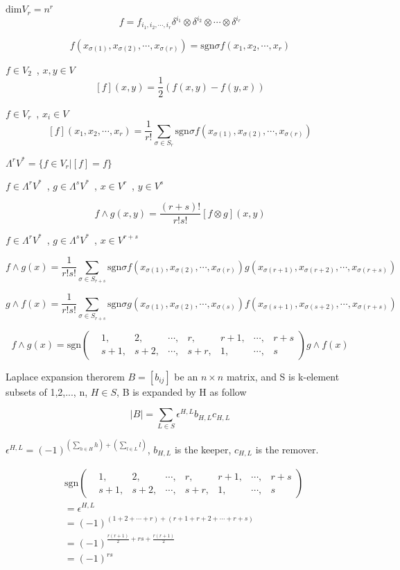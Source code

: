 \documentclass[12pt,a4paper]{article}
\begin{document}
$\mathrm{dim}V_r = n^r$
\[
	f = f_{i_1,i_2,\cdots,i_r} \delta^{i_1} \otimes \delta^{i_2} \otimes \cdots \otimes \delta^{i_r}
\]



$$
	f(x_{\sigma(1)},x_{\sigma(2)},\cdots,x_{\sigma(r)}) = \mathrm{sgn}\sigma f(x_1,x_2,\cdots,x_r) 
$$
\newline

$f \in V_2$ \,, $x,y \in V$
$$
	[f](x,y) = \frac{1}{2}(f(x,y)-f(y,x))
$$

$f \in V_r$ \,, $x_i \in V$
$$
	[f](x_1,x_2,\cdots,x_r) = \frac{1}{r!}\sum_{\sigma \in S_r} \mathrm{sgn}\sigma f(x_{\sigma(1)},x_{\sigma(2)},\cdots,x_{\sigma(r)})
$$

$ \Lambda^r V^* = \{f\in V_r |[f]=f \}$

$f \in \Lambda^r V^*$ \,, $g \in \Lambda^s V^*$ \,, $x \in V^r$ \,, $y \in V^s$

\[
	f\wedge g (x,y) = \frac{(r+s)!}{r!s!}[f\otimes g](x,y)
\]

$f \in \Lambda^r V^*$ \,, $g \in \Lambda^s V^*$ \,, $x \in V^{r+s}$

\[
	f\wedge g (x) = \frac{1}{r!s!}\sum_{\sigma \in S_{r+s}} \mathrm{sgn}\sigma f(x_{\sigma(1)},x_{\sigma(2)},\cdots,x_{\sigma(r)})g(x_{\sigma(r+1)},x_{\sigma(r+2)},\cdots,x_{\sigma(r+s)})
\]

\[
		g\wedge f (x) = \frac{1}{r!s!}\sum_{\sigma \in S_{r+s}} \mathrm{sgn}\sigma g(x_{\sigma(1)},x_{\sigma(2)},\cdots,x_{\sigma(s)})f(x_{\sigma(s+1)},x_{\sigma(s+2)},\cdots,x_{\sigma(r+s)})
\]

\[
	f\wedge g (x) =\mathrm{sgn}\begin{pmatrix}
	&1,&2,&\cdots,&r,&r+1,&\cdots,&r+s \\
	&s+1,&s+2,&\cdots,&s+r,&1,&\cdots,&s
	\end{pmatrix} g \wedge f(x)
\]

Laplace expansion therorem
$B = [b_{ij}]$ be an $n \times n$ matrix, and S is k-element subsets of {1,2,..., n}, $H \in S$, B is expanded by H as follow

\[
	|B| = \sum_{L \in S}\epsilon^{H,L}b_{H,L}c_{H,L}
\]

$\epsilon^{H,L} = (-1)^{(\sum_{h \in H} h)+(\sum_{l \in L} l)}$, $b_{H,L}$ is the keeper, $c_{H,L}$ is the remover.


\begin{align*}
&\mathrm{sgn}\begin{pmatrix}
	&1,&2,&\cdots,&r,&r+1,&\cdots,&r+s \\
	&s+1,&s+2,&\cdots,&s+r,&1,&\cdots,&s
	\end{pmatrix} \\&= \epsilon^{H,L} \\
	&=(-1)^{(1+2+\cdots+r)+(r+1+r+2+\cdots+r+s)} \\
	&=(-1)^{\frac{r(r+1)}{2}+rs+\frac{r(r+1)}{2}} \\
	&=(-1)^{rs}
\end{align*}
\end{document}

